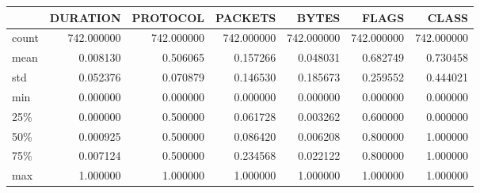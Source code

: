 \begin{tabular}{lrrrrrr}
\toprule
{} &    DURATION &    PROTOCOL &     PACKETS &       BYTES &       FLAGS &       CLASS \\
\midrule
count &  742.000000 &  742.000000 &  742.000000 &  742.000000 &  742.000000 &  742.000000 \\
mean  &    0.008130 &    0.506065 &    0.157266 &    0.048031 &    0.682749 &    0.730458 \\
std   &    0.052376 &    0.070879 &    0.146530 &    0.185673 &    0.259552 &    0.444021 \\
min   &    0.000000 &    0.000000 &    0.000000 &    0.000000 &    0.000000 &    0.000000 \\
25\%   &    0.000000 &    0.500000 &    0.061728 &    0.003262 &    0.600000 &    0.000000 \\
50\%   &    0.000925 &    0.500000 &    0.086420 &    0.006208 &    0.800000 &    1.000000 \\
75\%   &    0.007124 &    0.500000 &    0.234568 &    0.022122 &    0.800000 &    1.000000 \\
max   &    1.000000 &    1.000000 &    1.000000 &    1.000000 &    1.000000 &    1.000000 \\
\bottomrule
\end{tabular}
